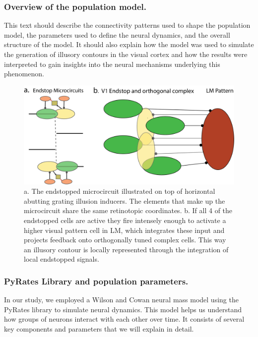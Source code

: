 \documentclass[12pt]{article}
\begin{document}
\subsubsection{Overview of the population model.}
This text should describe the connectivity patterns used to shape the population model, the parameters used to define the neural dynamics, and the overall structure of the model. It should also explain how the model was used to simulate the generation of illusory contours in the visual cortex and how the results were interpreted to gain insights into the neural mechanisms underlying this phenomenon.


\begin{figure}[H]
  \centering
  \includegraphics[width=1 \textwidth]{adjusted_figures/illusory_filling.png}
  \caption{a. The endstopped microcircuit illustrated on top of horizontal abutting grating illusion inducers. The elements that make up the microcircuit share the same retinotopic coordinates. b. If all 4 of the endstopped cells are active they fire intensely enough to activate a higher visual pattern cell in LM, which integrates these input and projects feedback onto orthogonally tuned complex cells. This way an illusory contour is locally represented through the integration of local endstopped signals.}
  \label{fig:illusory_filling}
\end{figure}


\subsubsection{PyRates Library and population parameters.}
In our study, we employed a Wilson and Cowan neural mass model using the PyRates library to simulate neural dynamics. This model helps us understand how groups of neurons interact with each other over time. It consists of several key components and parameters that we will explain in detail.
\end{document}
